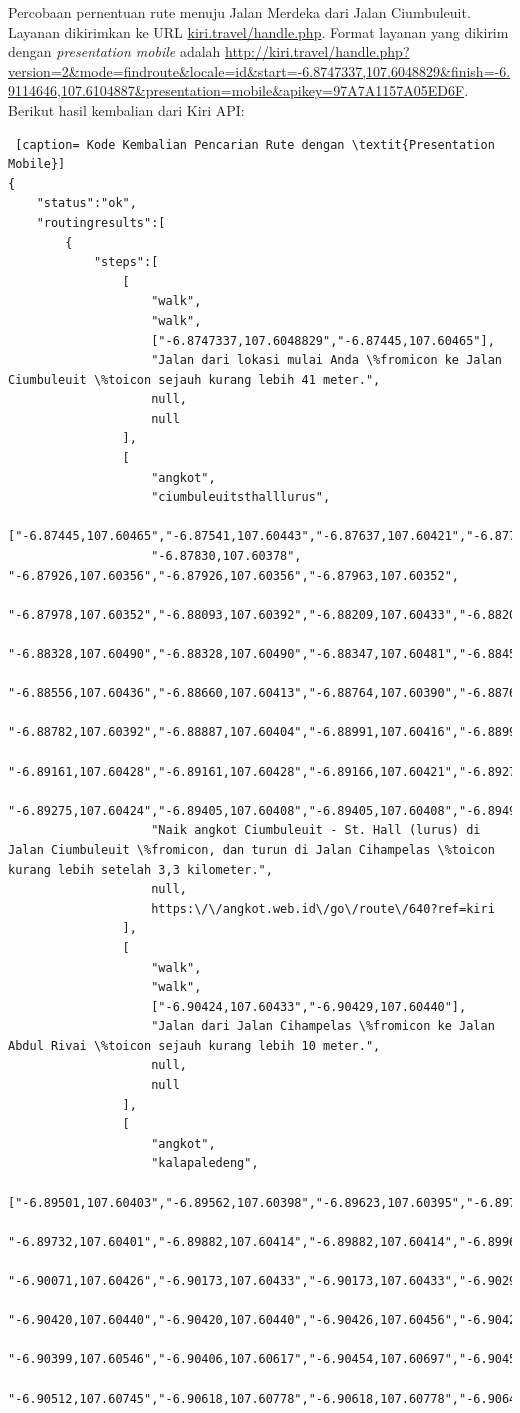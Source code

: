 Percobaan pernentuan rute menuju Jalan Merdeka dari Jalan Ciumbuleuit. Layanan dikirimkan ke URL \url{kiri.travel/handle.php}. Format layanan yang dikirim dengan \textit{presentation mobile} adalah \url{http://kiri.travel/handle.php?version=2&mode=findroute&locale=id&start=-6.8747337,107.6048829&finish=-6.9114646,107.6104887&presentation=mobile&apikey=97A7A1157A05ED6F}.
\newline
Berikut hasil kembalian dari Kiri API:
\begin{lstlisting} [caption= Kode Kembalian Pencarian Rute dengan \textit{Presentation Mobile}]
{
	"status":"ok",
	"routingresults":[
		{
			"steps":[
				[
					"walk",
					"walk",
					["-6.8747337,107.6048829","-6.87445,107.60465"],
					"Jalan dari lokasi mulai Anda \%fromicon ke Jalan Ciumbuleuit \%toicon sejauh kurang lebih 41 meter.",
					null,
					null
				],
				[
					"angkot",
					"ciumbuleuitsthalllurus",
					["-6.87445,107.60465","-6.87541,107.60443","-6.87637,107.60421","-6.87734,107.60400",
					"-6.87830,107.60378", "-6.87926,107.60356","-6.87926,107.60356","-6.87963,107.60352",
					"-6.87978,107.60352","-6.88093,107.60392","-6.88209,107.60433","-6.88209,107.60433",
					"-6.88328,107.60490","-6.88328,107.60490","-6.88347,107.60481","-6.88452,107.60459",
					"-6.88556,107.60436","-6.88660,107.60413","-6.88764,107.60390","-6.88764,107.60391",
					"-6.88782,107.60392","-6.88887,107.60404","-6.88991,107.60416","-6.88991,107.60416",
					"-6.89161,107.60428","-6.89161,107.60428","-6.89166,107.60421","-6.89275,107.60424",
					"-6.89275,107.60424","-6.89405,107.60408","-6.89405,107.60408","-6.89496,107.60400"],
					"Naik angkot Ciumbuleuit - St. Hall (lurus) di Jalan Ciumbuleuit \%fromicon, dan turun di Jalan Cihampelas \%toicon kurang lebih setelah 3,3 kilometer.",
					null,
					https:\/\/angkot.web.id\/go\/route\/640?ref=kiri
				],
				[
					"walk",
					"walk",
					["-6.90424,107.60433","-6.90429,107.60440"],
					"Jalan dari Jalan Cihampelas \%fromicon ke Jalan Abdul Rivai \%toicon sejauh kurang lebih 10 meter.",
					null,
					null
				],
				[
					"angkot",
					"kalapaledeng",
					["-6.89501,107.60403","-6.89562,107.60398","-6.89623,107.60395","-6.89732,107.60401",
					"-6.89732,107.60401","-6.89882,107.60414","-6.89882,107.60414","-6.89969,107.60418",
					"-6.90071,107.60426","-6.90173,107.60433","-6.90173,107.60433","-6.90297,107.60437",
					"-6.90420,107.60440","-6.90420,107.60440","-6.90426,107.60456","-6.90422,107.60481",
					"-6.90399,107.60546","-6.90406,107.60617","-6.90454,107.60697","-6.90454,107.60697",
					"-6.90512,107.60745","-6.90618,107.60778","-6.90618,107.60778","-6.90643,107.60787",

\end{lstlisting}
